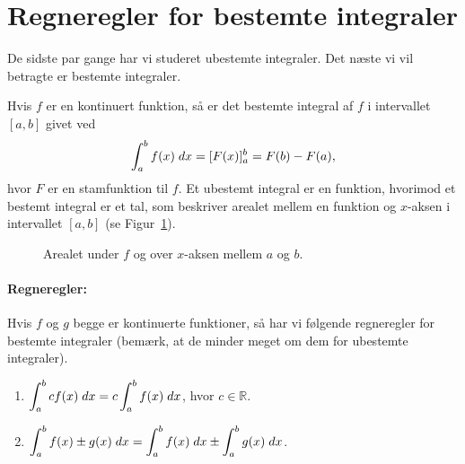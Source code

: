 \section{Regneregler for bestemte integraler}
\noindent De sidste par gange har vi studeret ubestemte integraler. Det næste vi vil betragte er bestemte integraler. 

Hvis $f$ er en kontinuert funktion, så er det bestemte integral af $f$ i intervallet $[a,b]$ givet ved
\begin{align*}
\int_a^b f(x) \; d x = [F(x)]^b_a = F(b)-F(a),
\end{align*}
hvor $F$ er en stamfunktion til $f$. Et ubestemt integral er en funktion, hvorimod et bestemt integral er et tal, som beskriver arealet mellem en funktion og $x$-aksen i intervallet $[a,b]$ (se Figur~\ref{fig:bestemtint1et}).
\begin{figure}[!htbp]
  \centering
  \caption{Arealet under $f$ og over $x$-aksen mellem $a$ og $b$.}
  \label{fig:bestemtint1et}
\end{figure}

\paragraph*{Regneregler:}
Hvis $f$ og $g$ begge er kontinuerte funktioner, så har vi følgende regneregler for bestemte integraler (bemærk, at de minder meget om dem for ubestemte integraler).
\begin{enumerate}
\item $\displaystyle \int_a^b cf(x) \; d x = c \int_a^b f(x) \; d x$, hvor $c \in \mathbb{R}$.
\item $\displaystyle \int_a^b f(x) \pm g(x) \; d x = \int_a^b f(x) \; d x \pm \int_a^b g(x) \; d x$.
\end{enumerate}

